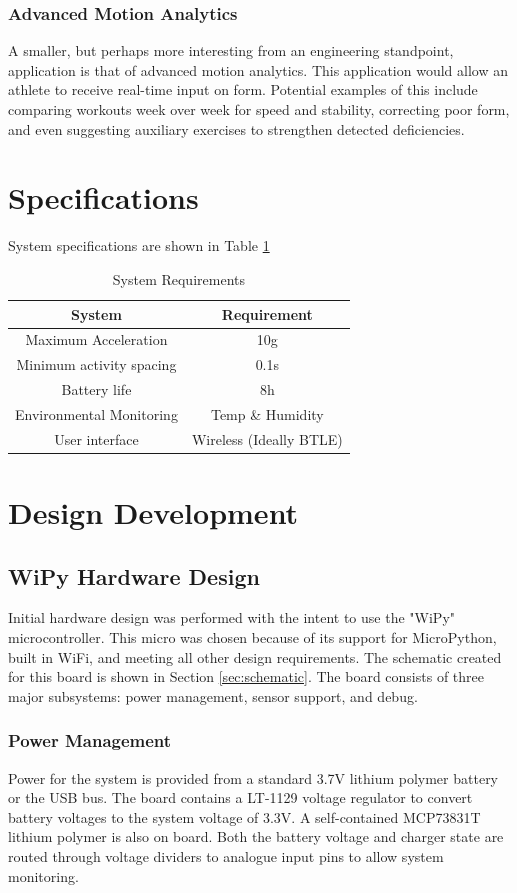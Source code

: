 \documentclass[11pt,oneside]{amsart}
\begin{document}
\subsubsection{Advanced Motion Analytics}
A smaller, but perhaps more interesting from an engineering standpoint, application is that of advanced motion analytics. This application would allow an athlete to receive real-time input on form. Potential examples of this include comparing workouts week over week for speed and stability, correcting poor form, and even suggesting auxiliary exercises to strengthen detected deficiencies.
\section{Specifications}
System specifications are shown in Table \ref{tab:spec}
\begin{table}[htp]
\caption{System Requirements}
\begin{center}
\begin{tabular}{|c|c|}
\hline
System& Requirement\\
\hline
Maximum Acceleration & 10g\\
\hline
Minimum activity spacing & 0.1s\\
\hline
Battery life & 8h\\
\hline
Environmental Monitoring & Temp \& Humidity\\
\hline
User interface & Wireless (Ideally BTLE)\\
\hline
\end{tabular}
\end{center}
\label{tab:spec}
\end{table}%

\section{Design Development}
\subsection{WiPy Hardware Design}
Initial hardware design was performed with the intent to use the "WiPy" microcontroller. This micro was chosen because of its support for MicroPython, built in WiFi, and meeting all other design requirements.  The schematic created for this board is shown in Section \ref{sec:schematic}. The board consists of three major subsystems: power management, sensor support, and debug.
\subsubsection{Power Management}
Power for the system is provided from a standard 3.7V lithium polymer battery or the USB bus. The board contains a LT-1129 voltage regulator to convert battery voltages to the system voltage of 3.3V. A self-contained MCP73831T lithium polymer is also on board. Both the battery voltage and charger state are routed through voltage dividers to analogue input pins to allow system monitoring.
\end{document}
